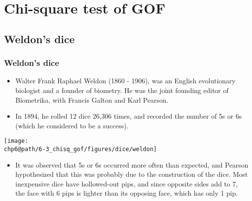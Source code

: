 \documentclass[slidestop,compress,mathserif]{beamer}
\makeatletter
\def\chp6@path{../../Chp 6}
\makeatother
\begin{document}
\section{Chi-square test of GOF}


\subsection{Weldon's dice}


\begin{frame}
\frametitle{Weldon's dice}

{
\begin{itemize}

\item Walter Frank Raphael Weldon (1860 - 1906), was an English evolutionary biologist and a founder of biometry. He was the joint founding editor of Biometrika, with Francis Galton and Karl Pearson.

\item In 1894, he rolled 12 dice 26,306 times, and recorded the number of 5s or 6s (which he considered to be a success).

\end{itemize}
}
{
\begin{center}
\texttt{[image: \\chp6@path/6-3\_chisq\_gof/figures/dice/weldon]}
\end{center}
}
\begin{itemize}

\item It was observed that 5s or 6s occurred more often than expected, and Pearson hypothesized that this was probably due to the construction of the dice. Most inexpensive dice have hollowed-out pips, and since opposite sides add to 7, the face with 6 pips is lighter than its opposing face, which has only 1 pip.

\end{itemize}

\end{frame}

\end{document}
